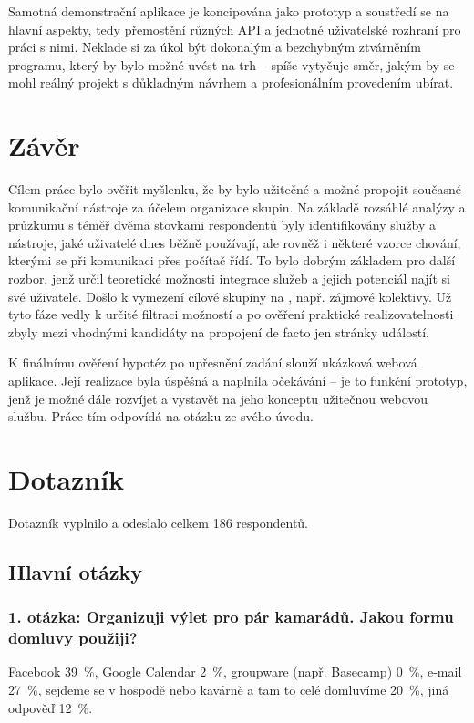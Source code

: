 \documentclass[12pt,oneside,final]{fithesis2}
\begin{document}
Samotná demonstrační aplikace je koncipována jako prototyp a soustředí se na hlavní aspekty, tedy přemostění různých API a jednotné uživatelské rozhraní pro práci s nimi. Neklade si za úkol být dokonalým a bezchybným ztvárněním programu, který by bylo možné uvést na trh -- spíše vytyčuje směr, jakým by se mohl reálný projekt s důkladným návrhem a profesionálním provedením ubírat.



\chapter{Závěr}
Cílem práce bylo ověřit myšlenku, že by bylo užitečné a možné propojit současné komunikační nástroje za účelem organizace skupin. Na základě rozsáhlé analýzy a průzkumu s téměř dvěma stovkami respondentů byly identifikovány služby a nástroje, jaké uživatelé dnes běžně používají, ale rovněž i některé vzorce chování, kterými se při komunikaci přes počítač řídí. To bylo dobrým základem pro další rozbor, jenž určil teoretické možnosti integrace služeb a jejich potenciál najít si své uživatele. Došlo k vymezení cílové skupiny na , např. zájmové kolektivy. Už tyto fáze vedly k určité filtraci možností a po ověření praktické realizovatelnosti zbyly mezi vhodnými kandidáty na propojení de facto jen stránky událostí.

K finálnímu ověření hypotéz po upřesnění zadání slouží ukázková webová aplikace. Její realizace byla úspěšná a naplnila očekávání -- je to funkční prototyp, jenž je možné dále rozvíjet a vystavět na jeho konceptu užitečnou webovou službu. Práce tím odpovídá na otázku ze svého úvodu.




\begin{flushleft}
\end{flushleft}



\appendix
\chapter{Dotazník}\label{pollAppendix}
Dotazník vyplnilo a odeslalo celkem 186 respondentů.

\section{Hlavní otázky}

\subsection*{1. otázka: Organizuji výlet pro pár kamarádů. Jakou formu domluvy použiji?}
Facebook 39~\%,
Google Calendar 2~\%,
groupware (např. Basecamp) 0~\%,
e-mail 27~\%,
sejdeme se v hospodě nebo kavárně a tam to celé domluvíme 20~\%,
jiná odpověď 12~\%.
\end{document}

